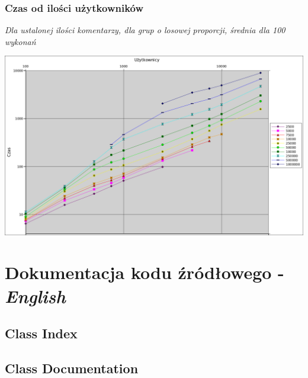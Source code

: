 \documentclass[11pt]{article}
\newcommand{\+}{\discretionary{\mbox{\scriptsize$\hookleftarrow$}}{}{}}
\begin{document}
  \clearpage
  \subsubsection{Czas od ilości użytkowników}
  \textsl{Dla ustalonej ilości komentarzy, dla grup o losowej proporcji, średnia dla 100 wykonań}\\
  \begin{centering}
  	\includegraphics[width=\textwidth]{Wykres2}
  \end{centering}


\clearpage  
\section{Dokumentacja kodu źródłowego - \textit{English}}
\subsection{Class Index}

\subsection{Class Documentation}
 
   
\end{document}
